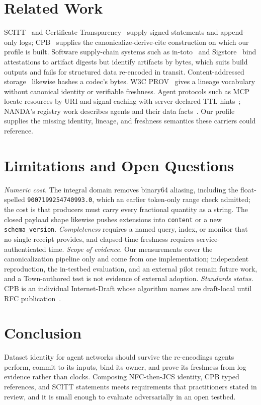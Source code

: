 \documentclass[conference]{IEEEtran}
\begin{document}
\section{Related Work}
SCITT~\cite{rfc9943} and Certificate Transparency~\cite{rfc9162} supply signed statements and append-only logs; CPB~\cite{cpb03} supplies the canonicalize-derive-cite construction on which our profile is built. Software supply-chain systems such as in-toto~\cite{intoto} and Sigstore~\cite{sigstore} bind attestations to artifact digests but identify artifacts by bytes, which suits build outputs and fails for structured data re-encoded in transit. Content-addressed storage~\cite{ipfs} likewise hashes a codec's bytes. W3C PROV~\cite{prov} gives a lineage vocabulary without canonical identity or verifiable freshness. Agent protocols such as MCP locate resources by URI and signal caching with server-declared TTL hints~\cite{mcp}; NANDA's registry work describes agents and their data facts~\cite{nanda}. Our profile supplies the missing identity, lineage, and freshness semantics these carriers could reference.

\section{Limitations and Open Questions}
\emph{Numeric cost.} The integral domain removes binary64 aliasing, including the float-spelled \texttt{9007199254740993.0}, which an earlier token-only range check admitted; the cost is that producers must carry every fractional quantity as a string. The closed payload shape likewise pushes extensions into \texttt{content} or a new \texttt{schema\_version}.
\emph{Completeness} requires a named query, index, or monitor that no single receipt provides, and elapsed-time freshness requires service-authenticated time.
\emph{Scope of evidence.} Our measurements cover the canonicalization pipeline only and come from one implementation; independent reproduction, the in-testbed evaluation, and an external pilot remain future work, and a Town-authored test is not evidence of external adoption.
\emph{Standards status.} CPB is an individual Internet-Draft whose algorithm names are draft-local until RFC publication~\cite{cpb03}.

\section{Conclusion}
Dataset identity for agent networks should survive the re-encodings agents perform, commit to its inputs, bind its owner, and prove its freshness from log evidence rather than clocks. Composing NFC-then-JCS identity, CPB typed references, and SCITT statements meets requirements that practitioners stated in review, and it is small enough to evaluate adversarially in an open testbed.
\end{document}
